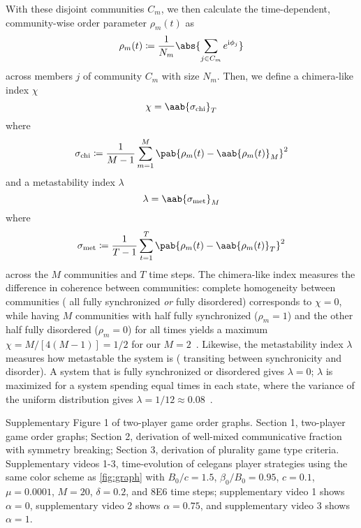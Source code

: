 \documentclass[pdflatex,lineno,referee,sn-nature]{sn-jnl}
\begin{document}
With these disjoint communities $C_m$, we then calculate
the time-dependent, community-wise order parameter $\rho_m(t)$
as
\begin{equation}
  \rho_m(t) \coloneqq \frac{1}{N_m} \abs{\sum_{j \in C_m} e^{\im \phi_j}}
\end{equation}
across members $j$ of community $C_m$ with size $N_m$.
Then, we define a chimera-like index $\chi$
\begin{equation}
  \chi = \aab{
    \sigma_{\text{chi}}}_T
  \label{eq:chimera_index}
\end{equation}
where
\begin{equation*}
    \sigma_{\text{chi}} \coloneqq \frac{1}{M-1} \sum_{m=1}^M
    \pab{\rho_m(t) - \aab{\rho_m(t)}_M}^2
\end{equation*}
and a metastability index $\lambda$
\begin{equation}
  \lambda = \aab{
    \sigma_{\text{met}}}_M
  \label{eq:metastability_index}
\end{equation}
where
\begin{equation*}
    \sigma_{\text{met}} \coloneqq \frac{1}{T-1} \sum_{t=1}^T
    \pab{\rho_m(t) - \aab{\rho_m(t)}_T}^2
\end{equation*}
across the $M$ communities and $T$ time steps.
The chimera-like index measures the difference in coherence between communities:
complete homogeneity between communities
(\eg{} all fully synchronized \emph{or} fully disordered)
corresponds to $\chi = 0$,
while having $M$ communities
with half fully synchronized ($\rho_m = 1$)
and the other half fully disordered ($\rho_m = 0$)
for all times yields a maximum $\chi = M/[4(M-1)]
= 1/2$ for our $M=2$\approx~\citep{shanahan2010metastable}.
Likewise, the metastability index $\lambda$ measures how metastable
the system is (\ie{} transiting between synchronicity and disorder).
A system that is fully synchronized or disordered gives $\lambda = 0$;
$\lambda$ is maximized for a system spending equal times in each state,
where the variance of the uniform distribution gives
$\lambda = 1/12 \approx \num{0.08}$~\citep{shanahan2010metastable}.

\backmatter{}

Supplementary Figure 1 of two-player game order graphs.
Section 1, two-player game order graphs;
Section 2, derivation of well-mixed communicative fraction
with symmetry breaking;
Section 3, derivation of plurality game type criteria.
Supplementary videos 1-3,
time-evolution of \gls{celegans} player strategies
using the same color scheme as \cref{fig:graph}
with $B_0/c = 1.5$, $\beta_0/B_0 = 0.95$, $c = 0.1$,
$\mu = 0.0001$, $M = 20$, $\delta = 0.2$, and \num{8E6} time steps;
supplementary video 1 shows $\alpha = 0$,
supplementary video 2 shows $\alpha = 0.75$,
and
supplementary video 3 shows $\alpha = 1$.
\end{document}
